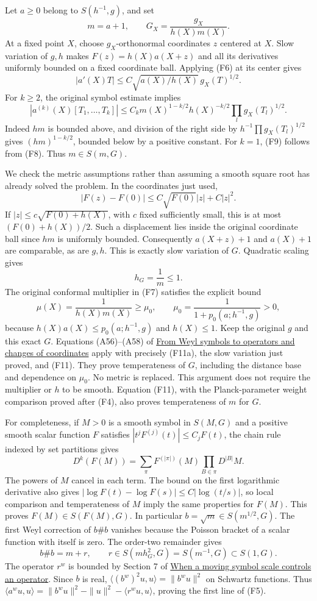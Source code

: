 \documentclass[
  11pt,
]{article}
\begin{document}
Let \(a\geq0\) belong to \(S(h^{-1},g)\), and set \[
m=a+1,\qquad G_X=\frac{g_X}{h(X)m(X)}.
\tag{F7}
\] At a fixed point \(X\), choose \(g_X\)-orthonormal coordinates \(z\)
centered at \(X\). Slow variation of \(g,h\) makes \(F(z)=h(X)a(X+z)\)
and all its derivatives uniformly bounded on a fixed coordinate ball.
Applying (F6) at its center gives \[
|a'(X)T|\leq C\sqrt{a(X)/h(X)}\,g_X(T)^{1/2}.
\tag{F8}
\] For \(k\geq2\), the original symbol estimate implies \[
|a^{(k)}(X)[T_1,\ldots,T_k]|
\leq C_k m(X)^{1-k/2}h(X)^{-k/2}
             \prod_l g_X(T_l)^{1/2}.
\tag{F9}
\] Indeed \(h m\) is bounded above, and division of the right side by
\(h^{-1}\prod g_X(T_l)^{1/2}\) gives \((hm)^{1-k/2}\), bounded below by
a positive constant. For \(k=1\), (F9) follows from (F8). Thus
\(m\in S(m,G)\).

We check the metric assumptions rather than assuming a smooth square
root has already solved the problem. In the coordinates just used, \[
|F(z)-F(0)|\leq C\sqrt{F(0)}|z|+C|z|^2.
\tag{F10}
\] If \(|z|\leq c\sqrt{F(0)+h(X)}\), with \(c\) fixed sufficiently
small, this is at most \((F(0)+h(X))/2\). Such a displacement lies
inside the original coordinate ball since \(hm\) is uniformly bounded.
Consequently \(a(X+z)+1\) and \(a(X)+1\) are comparable, as are \(g,h\).
This is exactly slow variation of \(G\). Quadratic scaling gives \[
h_G=\frac1m\leq1.
\tag{F11}
\] The original conformal multiplier in (F7) satisfies the explicit
bound \[
 \mu(X)=\frac1{h(X)m(X)}\ge\mu_0,
 \qquad \mu_0=\frac1{1+p_0(a;h^{-1},g)}>0,
 \tag{F11a}
\] because \(h(X)a(X)\le p_0(a;h^{-1},g)\) and \(h(X)\le1\). Keep the
original \(g\) and this exact \(G\). Equations (A56)--(A58) of
\href{weyl-covariance-action.pdf}{From Weyl symbols to operators and
changes of coordinates} apply with precisely (F11a), the slow variation
just proved, and (F11). They prove temperateness of \(G\), including the
distance base and dependence on \(\mu_0\). No metric is replaced. This
argument does not require the multiplier or \(h\) to be smooth. Equation
(F11), with the Planck-parameter weight comparison proved after (F4),
also proves temperateness of \(m\) for \(G\).

For completeness, if \(M>0\) is a smooth symbol in \(S(M,G)\) and a
positive smooth scalar function \(F\) satisfies
\(|t^jF^{(j)}(t)|\leq C_jF(t)\), the chain rule indexed by set
partitions gives \[
D^k(F(M))=
 \sum_{\pi}F^{(|\pi|)}(M)
          \prod_{B\in\pi}D^{|B|}M.
\tag{F12}
\] The powers of \(M\) cancel in each term. The bound on the first
logarithmic derivative also gives
\(|\log F(t)-\log F(s)|\leq C|\log(t/s)|\), so local comparison and
temperateness of \(M\) imply the same properties for \(F(M)\). This
proves \(F(M)\in S(F(M),G)\). In particular
\(b=\sqrt m\in S(m^{1/2},G)\). The first Weyl correction of \(b\#b\)
vanishes because the Poisson bracket of a scalar function with itself is
zero. The order-two remainder gives \[
b\#b=m+r,\qquad r\in S(mh_G^2,G)=S(m^{-1},G)\subset S(1,G).
\tag{F13}
\] The operator \(r^w\) is bounded by Section 7 of
\href{metric-operator-bounds.pdf}{When a moving symbol scale controls an
operator}. Since \(b\) is real, \(\langle(b^w)^2u,u\rangle=\|b^wu\|^2\)
on Schwartz functions. Thus
\(\langle a^wu,u\rangle=\|b^wu\|^2-\|u\|^2-\langle r^wu,u\rangle\),
proving the first line of (F5).
\end{document}
